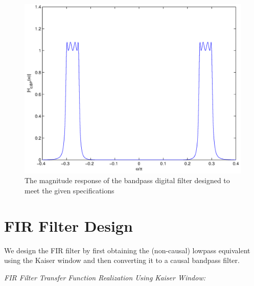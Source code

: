 \documentclass[journal,12pt,twocolumn]{IEEEtran}
\theoremstyle{remark}
\begin{document}
\begin{figure}[htbp] 
\centering
\includegraphics[width=\columnwidth]{figs/PNG/IIR/fig4.png}
\caption{The magnitude response of the bandpass digital filter designed to meet the given specifications}
\end{figure}
\section{FIR Filter Design}
We design the FIR filter by first obtaining the (non-causal) lowpass equivalent
using the Kaiser window and then converting it to a causal bandpass filter.

{\em FIR Filter Transfer Function Realization Using Kaiser Window:}
\end{document}
